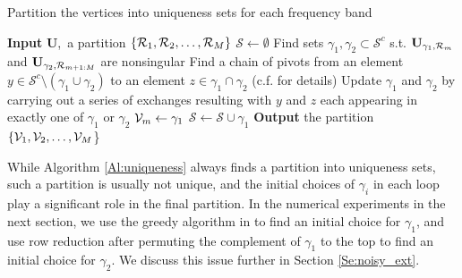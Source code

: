 \documentclass[journal, 10pt]{IEEEtran}
\begin{document}
\begin{algorithm} 
\caption{Partition the vertices into uniqueness sets for each frequency band}
\begin{algorithmic}
\State \textbf{Input} $\mathbf{U}$,~a partition $\{{{\cal R}_1,{\cal R}_2,\ldots,{\cal R}_M}\}$ %
\State $\mathcal{S} \gets \emptyset$
\State Find sets $\gamma_1, \gamma_2 \subset {\mathcal{S}}^c$ s.t. $\mathbf{U}_{\gamma_1,{\cal R}_m}$ and $\mathbf{U}_{\gamma_2,{\cal R}_{m+1:M}}$ are nonsingular
\While {$\gamma_1 \cap \gamma_2 \neq \emptyset$}
\State Find a chain of pivots from an element $y \in {\mathcal S}^c \setminus (\gamma_1 \cup \gamma_2)$
to an element $z \in \gamma_1 \cap \gamma_2$ (c.f. \cite{greene_magnanti} for details)
\State Update $\gamma_1$ and $\gamma_2$ by carrying out a series of exchanges resulting with $y$ and $z$ each appearing in exactly one of $\gamma_1$ or $\gamma_2$
\EndWhile
\State ${\mathcal{V}}_m \gets \gamma_1$%
\State $\mathcal{S} \gets \mathcal{S} \cup \gamma_1$ %
\EndFor
\State \textbf{Output} the partition $\{{\mathcal{V}}_1,{\mathcal{V}}_2,\ldots,{\mathcal{V}}_M$\}
\end{algorithmic}
\label{Al:uniqueness}
\end{algorithm}

\begin{remark}
While Algorithm \ref{Al:uniqueness} always finds a partition into uniqueness sets, such a partition is usually not unique, and the initial choices of $\gamma_i$ in each loop play a significant role in the final 
partition. In the numerical experiments in the next section, we use the greedy algorithm in \cite[Algorithm 1]{shomorony} to find an initial choice for $\gamma_1$, and use row reduction after permuting the complement of $\gamma_1$ to the top to find an initial choice for $\gamma_2$. We discuss this issue further in Section \ref{Se:noisy_ext}.
\end{remark}
\end{document}
